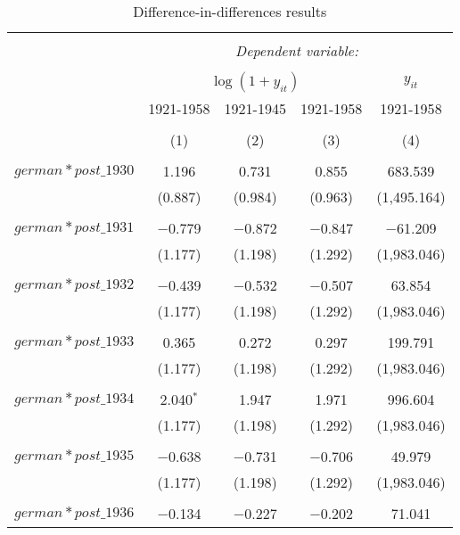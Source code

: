 

\begin{table}[!htbp] \centering 
  \caption{Difference-in-differences results} 
  \label{dif_table} 
\begin{tabular}{@{\extracolsep{5pt}}lcccc} 
\\[-1.8ex]\hline 
\hline \\[-1.8ex] 
 & \multicolumn{4}{c}{\textit{Dependent variable:}} \\ 
\cline{2-5} 
\\[-1.8ex] & \multicolumn{3}{c}{$\log(1 + y_{it})$} & $y_{it}$ \\ 
 & 1921-1958 & 1921-1945 & 1921-1958 & 1921-1958 \\ 
\\[-1.8ex] & (1) & (2) & (3) & (4)\\ 
\hline \\[-1.8ex] 
 $german*post\_1930$ & 1.196 & 0.731 & 0.855 & 683.539 \\ 
  & (0.887) & (0.984) & (0.963) & (1,495.164) \\ 
  & & & & \\ 
 $german*post\_1931$ & $-$0.779 & $-$0.872 & $-$0.847 & $-$61.209 \\ 
  & (1.177) & (1.198) & (1.292) & (1,983.046) \\ 
  & & & & \\ 
 $german*post\_1932$ & $-$0.439 & $-$0.532 & $-$0.507 & 63.854 \\ 
  & (1.177) & (1.198) & (1.292) & (1,983.046) \\ 
  & & & & \\ 
 $german*post\_1933$ & 0.365 & 0.272 & 0.297 & 199.791 \\ 
  & (1.177) & (1.198) & (1.292) & (1,983.046) \\ 
  & & & & \\ 
 $german*post\_1934$ & 2.040$^{*}$ & 1.947 & 1.971 & 996.604 \\ 
  & (1.177) & (1.198) & (1.292) & (1,983.046) \\ 
  & & & & \\ 
 $german*post\_1935$ & $-$0.638 & $-$0.731 & $-$0.706 & 49.979 \\ 
  & (1.177) & (1.198) & (1.292) & (1,983.046) \\ 
  & & & & \\ 
 $german*post\_1936$ & $-$0.134 & $-$0.227 & $-$0.202 & 71.041 \\ 

\end{tabular}
\end{table}
